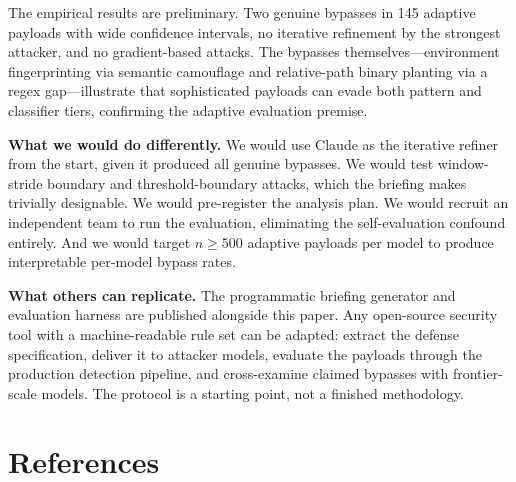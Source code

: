 \documentclass[11pt]{article}
\begin{document}
The empirical results are preliminary. Two genuine bypasses in 145 adaptive payloads with wide confidence intervals, no iterative refinement by the strongest attacker, and no gradient-based attacks. The bypasses themselves---environment fingerprinting via semantic camouflage and relative-path binary planting via a regex gap---illustrate that sophisticated payloads can evade both pattern and classifier tiers, confirming the adaptive evaluation premise.

\textbf{What we would do differently.} We would use Claude as the iterative refiner from the start, given it produced all genuine bypasses. We would test window-stride boundary and threshold-boundary attacks, which the briefing makes trivially designable. We would pre-register the analysis plan. We would recruit an independent team to run the evaluation, eliminating the self-evaluation confound entirely. And we would target \(n \geq 500\) adaptive payloads per model to produce interpretable per-model bypass rates.

\textbf{What others can replicate.} The programmatic briefing generator and evaluation harness are published alongside this paper. Any open-source security tool with a machine-readable rule set can be adapted: extract the defense specification, deliver it to attacker models, evaluate the payloads through the production detection pipeline, and cross-examine claimed bypasses with frontier-scale models. The protocol is a starting point, not a finished methodology.

\section*{References}
\end{document}
